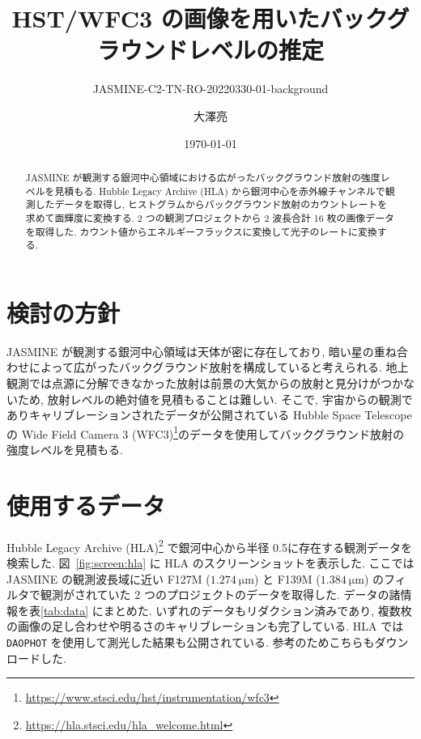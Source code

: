 \documentclass[10pt,a4paper,dvipdfmx,uplatex]{jsarticle}
\title{HST/WFC3 の画像を用いたバックグラウンドレベルの推定}
\subtitle{JASMINE-C2-TN-RO-20220330-01-background}
\author{大澤亮}
\date{\today}
\begin{document}
\maketitle

\begin{abstract}
  JASMINE が観測する銀河中心領域における広がったバックグラウンド放射の強度レベルを見積もる. Hubble Legacy Archive (HLA) から銀河中心を赤外線チャンネルで観測したデータを取得し, ヒストグラムからバックグラウンド放射のカウントレートを求めて面輝度に変換する. 2 つの観測プロジェクトから 2 波長合計 16 枚の画像データを取得した. カウント値からエネルギーフラックスに変換して光子のレートに変換する.
\end{abstract}

\section{検討の方針}
JASMINE が観測する銀河中心領域は天体が密に存在しており, 暗い星の重ね合わせによって広がったバックグラウンド放射を構成していると考えられる. 地上観測では点源に分解できなかった放射は前景の大気からの放射と見分けがつかないため, 放射レベルの絶対値を見積もることは難しい. そこで, 宇宙からの観測でありキャリブレーションされたデータが公開されている Hubble Space Telescope の Wide Field Camera 3 (WFC3)\footnote{\url{https://www.stsci.edu/hst/instrumentation/wfc3}}のデータを使用してバックグラウンド放射の強度レベルを見積もる.


\section{使用するデータ}
Hubble Legacy Archive (HLA)\footnote{\url{https://hla.stsci.edu/hla_welcome.html}} で銀河中心から半径 0.5\deg に存在する観測データを検索した. 図~\ref{fig:screen:hla} に HLA のスクリーンショットを表示した. ここでは JASMINE の観測波長域に近い F127M ($\SI{1.274}{\micro\meter}$) と F139M ($\SI{1.384}{\micro\meter}$) のフィルタで観測がされていた 2 つのプロジェクトのデータを取得した. データの諸情報を表\ref{tab:data} にまとめた. いずれのデータもリダクション済みであり, 複数枚の画像の足し合わせや明るさのキャリブレーションも完了している. HLA では \texttt{DAOPHOT} を使用して測光した結果も公開されている. 参考のためこちらもダウンロードした.
\end{document}
